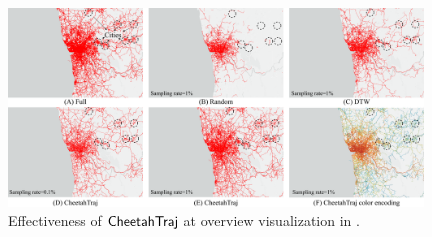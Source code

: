 


\begin{figure}[t]
	\centering
	\includegraphics[width=0.98\textwidth]{pictures/case_study_icde/case_study_overview.pdf}
	\trim
	\caption{Effectiveness of $\mathsf{CheetahTraj}$ at overview visualization in \pt{}.}
	\label{fig:overview}
	\trim \trim
\end{figure}


